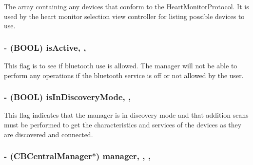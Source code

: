 The array containing any devices that conform to the \hyperlink{protocol_heart_monitor_protocol-p}{Heart\-Monitor\-Protocol}. It is used by the heart monitor selection view controller for listing possible devices to use. \hypertarget{interface_b_t_device_manager_a0864f241d9fc14f03e5f8e2b4dd0667a}{
\subsubsection[{is\-Active}]{\setlength{\rightskip}{0pt plus 5cm}-\/ (B\-O\-O\-L) is\-Active\hspace{0.3cm}{\ttfamily [read]}, {\ttfamily [write]}, {\ttfamily [atomic]}}}\label{interface_b_t_device_manager_a0864f241d9fc14f03e5f8e2b4dd0667a}
This flag is to see if bluetooth use is allowed. The manager will not be able to perform any operations if the bluetooth service is off or not allowed by the user. \hypertarget{interface_b_t_device_manager_a15cc71749368c5de76624c5c4e4f7b3c}{
\subsubsection[{is\-In\-Discovery\-Mode}]{\setlength{\rightskip}{0pt plus 5cm}-\/ (B\-O\-O\-L) is\-In\-Discovery\-Mode\hspace{0.3cm}{\ttfamily [read]}, {\ttfamily [write]}, {\ttfamily [atomic]}}}\label{interface_b_t_device_manager_a15cc71749368c5de76624c5c4e4f7b3c}
This flag indicates that the manager is in discovery mode and that addition scans must be performed to get the characteristics and services of the devices as they are discovered and connected. \hypertarget{interface_b_t_device_manager_a61d03c41c000f28ce50e88bd9b8f6be9}{
\subsubsection[{manager}]{\setlength{\rightskip}{0pt plus 5cm}-\/ (C\-B\-Central\-Manager$\ast$) manager\hspace{0.3cm}{\ttfamily [read]}, {\ttfamily [write]}, {\ttfamily [atomic]}, {\ttfamily [retain]}}}\label{interface_b_t_device_manager_a61d03c41c000f28ce50e88bd9b8f6be9}
